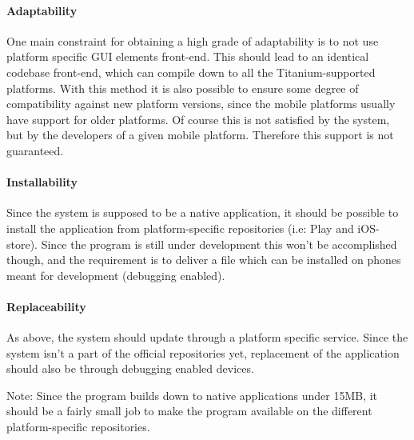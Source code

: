 \paragraph{Adaptability}
One main constraint for obtaining a high grade of adaptability is to not use platform specific GUI elements front-end. This should lead to an identical codebase front-end, which can compile down to all the Titanium-supported platforms. With this method it is also possible to ensure some degree of compatibility against new platform versions, since the mobile platforms usually have support for older platforms. Of course this is not satisfied by the system, but by the developers of a given mobile platform. Therefore this support is not guaranteed.  

\paragraph{Installability}
Since the system is supposed to be a native application, it should be possible to install the application from platform-specific repositories (i.e: Play and iOS-store). Since the program is still under development this won't be accomplished though, and the requirement is to deliver a file which can be installed on phones meant for development (debugging enabled).

\paragraph{Replaceability}
As above, the system should update through a platform specific service. Since the system isn't a part of the official repositories yet, replacement of the application should also be through debugging enabled devices. 

Note: Since the program builds down to native applications under 15MB, it should be a fairly small job to make the program available on the different platform-specific repositories.  



